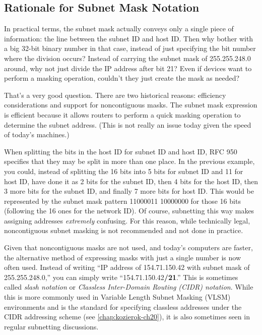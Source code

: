 \subsection{Rationale for Subnet Mask Notation}

In practical terms, the subnet mask actually conveys only a single piece
of information: the line between the subnet ID and host ID. Then why
bother with a big 32-bit binary number in that case, instead of just
specifying the bit number where the division occurs? Instead of carrying
the subnet mask of 255.255.248.0 around, why not just divide the IP
address after bit 21? Even if devices want to perform a masking
operation, couldn't they just create the mask as needed?

That's a very good question. There are two historical reasons:
efficiency considerations and support for
\protect\hypertarget{ch18s03.htmlux5cux23idx-CHP-18-0727}{}{}noncontiguous
masks. The subnet mask expression is efficient because it allows routers
to perform a quick masking operation to determine the subnet address.
(This is not really an issue today given the speed of today's machines.)

When splitting the bits in the host ID for subnet ID and host ID, RFC
950 specifies that they may be split in more than one place. In the
previous example, you could, instead of splitting the 16 bits into 5
bits for subnet ID and 11 for host ID, have done it as 2 bits for the
subnet ID, then 4 bits for the host ID, then 3 more bits for the subnet
ID, and finally 7 more bits for host ID. This would be represented by
the subnet mask pattern 11000011 10000000 for those 16 bits (following
the 16 ones for the network ID). Of course, subnetting this way makes
assigning addresses {\emph{extremely}} confusing. For this reason, while
technically legal, noncontiguous subnet masking is not recommended and
not done in practice.

Given that noncontiguous masks are not used, and today's computers are
faster, the alternative method of expressing masks with just a single
number is now often used. Instead of writing
``IP address of 154.71.150.42 with subnet mask of 255.255.248.0,'' you can simply
write ``154.71.150.42\textbf{/21}.''
This is sometimes called \emph{slash notation} or
\emph{Classless Inter-Domain Routing} {\emph{(CIDR) notation}}.
While this is more commonly used in Variable Length Subnet Masking (VLSM) environments and is the standard for specifying classless addresses under the CIDR addressing scheme (see \vref{chap:kozierok-ch20}), it is also sometimes seen in regular subnetting discussions.

